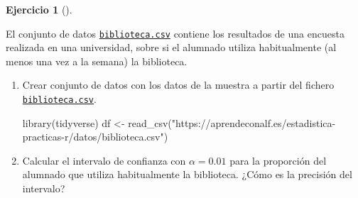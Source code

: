 \documentclass[
  a4paper,
]{scrreport}
\newenvironment{Shaded}{\begin{snugshade}}{\end{snugshade}}
\newcommand{\FunctionTok}[1]{\textcolor[rgb]{0.28,0.35,0.67}{#1}}
\newcommand{\NormalTok}[1]{\textcolor[rgb]{0.00,0.23,0.31}{#1}}
\newcommand{\OtherTok}[1]{\textcolor[rgb]{0.00,0.23,0.31}{#1}}
\newcommand{\StringTok}[1]{\textcolor[rgb]{0.13,0.47,0.30}{#1}}
\theoremstyle{definition}
\newtheorem{exercise}{Ejercicio}[chapter]
\theoremstyle{remark}
\begin{document}
\begin{exercise}[]\protect\hypertarget{exr-uso-biblioteca}{}\label{exr-uso-biblioteca}

El conjunto de datos
\href{https://aprendeconalf.es/estadistica-practicas-r/datos/biblioteca.csv}{\texttt{biblioteca.csv}}
contiene los resultados de una encuesta realizada en una universidad,
sobre si el alumnado utiliza habitualmente (al menos una vez a la
semana) la biblioteca.

\begin{enumerate}
\def\labelenumi{\alph{enumi}.}
\item
  Crear conjunto de datos con los datos de la muestra a partir del
  fichero
  \href{https://aprendeconalf.es/estadistica-practicas-r/datos/biblioteca.csv}{\texttt{biblioteca.csv}}.

  \begin{tcolorbox}[enhanced jigsaw, toprule=.15mm, rightrule=.15mm, arc=.35mm, colback=white, colbacktitle=quarto-callout-tip-color!10!white, toptitle=1mm, left=2mm, colframe=quarto-callout-tip-color-frame, opacityback=0, breakable, opacitybacktitle=0.6, bottomtitle=1mm, titlerule=0mm, title=\textcolor{quarto-callout-tip-color}{\faLightbulb}\hspace{0.5em}{Solución}, bottomrule=.15mm, coltitle=black, leftrule=.75mm]

\begin{Shaded}
\begin{Highlighting}[]
\FunctionTok{library}\NormalTok{(tidyverse)}
\NormalTok{df }\OtherTok{\textless{}{-}} \FunctionTok{read\_csv}\NormalTok{(}\StringTok{"https://aprendeconalf.es/estadistica{-}practicas{-}r/datos/biblioteca.csv"}\NormalTok{)}
\end{Highlighting}
\end{Shaded}

  \end{tcolorbox}
\item
  Calcular el intervalo de confianza con \(\alpha=0.01\) para la
  proporción del alumnado que utiliza habitualmente la biblioteca. ¿Cómo
  es la precisión del intervalo?

  \begin{tcolorbox}[enhanced jigsaw, toprule=.15mm, rightrule=.15mm, arc=.35mm, colback=white, colbacktitle=quarto-callout-tip-color!10!white, toptitle=1mm, left=2mm, colframe=quarto-callout-tip-color-frame, opacityback=0, breakable, opacitybacktitle=0.6, bottomtitle=1mm, titlerule=0mm, title=\textcolor{quarto-callout-tip-color}{\faLightbulb}\hspace{0.5em}{Solución}, bottomrule=.15mm, coltitle=black, leftrule=.75mm]


\end{tcolorbox}
\end{enumerate}
\end{exercise}
\end{document}
